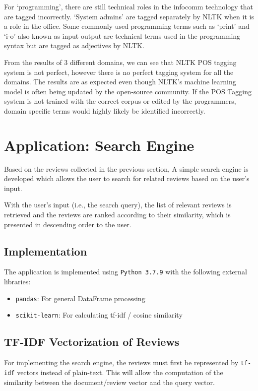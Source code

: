 \documentclass[sigconf,nonacm=true]{acmart}
\begin{document}
For ‘programming’, there are still technical roles in the infocomm technology that are tagged incorrectly. ‘System admins’ are tagged separately by NLTK when it is a role in the office. Some commonly used programming terms such as ‘print’ and ‘i-o’ also known as input output are technical terms used in the programming syntax but are tagged as adjectives by NLTK.

From the results of 3 different domains, we can see that NLTK POS tagging system is not perfect, however there is no perfect tagging system for all the domains. The results are as expected even though NLTK’s machine learning model is often being updated by the open-source community. If the POS Tagging system is not trained with the correct corpus or edited by the programmers, domain specific terms would highly likely be identified incorrectly.

\section{Application: Search Engine}
Based on the reviews collected in the previous section, A simple search
engine is developed which allows the user to search for related reviews
based on the user's input.

With the user's input (i.e., the search query), the list
of relevant reviews is retrieved and the reviews are ranked according
to their similarity, which is presented in descending order to the user.

\subsection{Implementation}
The application is implemented using \verb|Python 3.7.9| with the following external
libraries:
\begin{itemize}
	\item {\verb|pandas|}: For general DataFrame processing
	\item {\verb|scikit-learn|}: For calculating tf-idf / cosine similarity
\end{itemize}


\subsection{TF-IDF Vectorization of Reviews}
For implementing the search engine, the reviews must first be represented by
\verb|tf-idf| vectors instead of plain-text. This will allow the computation
of the similarity between the document/review vector and the query vector.
\end{document}
